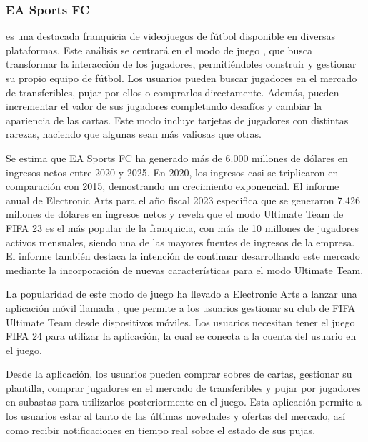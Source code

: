 \subsubsection{EA Sports FC}
 es una destacada franquicia de videojuegos de fútbol disponible en diversas plataformas. 
Este análisis se centrará en el modo de juego , 
que busca transformar la interacción de los jugadores, permitiéndoles construir y gestionar su propio equipo de fútbol. Los usuarios pueden buscar jugadores en el mercado de transferibles, 
pujar por ellos o comprarlos directamente. Además, pueden incrementar el valor de sus jugadores completando desafíos y cambiar la apariencia de las cartas. 
Este modo incluye tarjetas de jugadores con distintas rarezas, haciendo que algunas sean más valiosas que otras.

Se estima que EA Sports FC ha generado más de 6.000 millones de dólares en ingresos netos entre 2020 y 2025\cite{sanmartin000MillonesDolares2021}. En 2020, 
los ingresos casi se triplicaron en comparación con 2015, demostrando un crecimiento exponencial. El informe anual de Electronic Arts para el año fiscal 2023\cite{ea2023} 
especifica que se generaron 7.426 millones de dólares en ingresos netos y revela que el modo Ultimate Team de FIFA 23 es el más popular de la franquicia, con más de 10 millones 
de jugadores activos mensuales, siendo una de las mayores fuentes de ingresos de la empresa. El informe también destaca la intención de continuar desarrollando este mercado 
mediante la incorporación de nuevas características para el modo Ultimate Team.

La popularidad de este modo de juego ha llevado a Electronic Arts a lanzar una aplicación móvil llamada , 
que permite a los usuarios gestionar su club de FIFA Ultimate Team desde dispositivos móviles. Los usuarios necesitan tener el juego FIFA 24 para utilizar la aplicación, 
la cual se conecta a la cuenta del usuario en el juego. 

Desde la aplicación, los usuarios pueden comprar sobres de cartas, gestionar su plantilla, comprar jugadores en el mercado de transferibles y pujar por jugadores en subastas para utilizarlos posteriormente en el juego. 
Esta aplicación permite a los usuarios estar al tanto de las últimas novedades y ofertas del mercado, así como recibir notificaciones en tiempo real sobre el estado de sus pujas.

